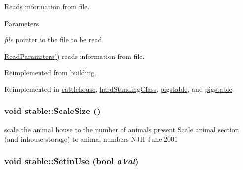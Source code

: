 Reads information from file. 
\begin{DoxyParams}{Parameters}
\item[{\em file}]pointer to the file to be read\end{DoxyParams}
\hyperlink{classstable_ab0195f308a48e008485cf5d04955a741}{ReadParameters()} reads information from file. 

Reimplemented from \hyperlink{classbuilding_a5649b5598b63c3a4cf7a4e6e7d452d5d}{building}.

Reimplemented in \hyperlink{classcattlehouse_a113f5bf0d97865c9872c0c4efd073861}{cattlehouse}, \hyperlink{classhard_standing_class_a87b03d8140b5d5913fc8e79cc8229410}{hardStandingClass}, \hyperlink{classpigstable_a97e3706555a93da782e5418df532078c}{pigstable}, and \hyperlink{classpigstable_aa31308b795d7a454e5156e8c2f49fe47}{pigstable}.\hypertarget{classstable_af4e0be5221f1bddebfe9297188e00089}{
\subsubsection[{ScaleSize}]{\setlength{\rightskip}{0pt plus 5cm}void stable::ScaleSize ()}}
\label{classstable_af4e0be5221f1bddebfe9297188e00089}


scale the \hyperlink{classanimal}{animal} house to the number of animals present Scale \hyperlink{classanimal}{animal} section (and inhouse \hyperlink{classstorage}{storage}) to \hyperlink{classanimal}{animal} numbers NJH June 2001 \hypertarget{classstable_a001595b56aa1e470ed4f54f3df9208ed}{
\subsubsection[{SetinUse}]{\setlength{\rightskip}{0pt plus 5cm}void stable::SetinUse (bool {\em aVal})}}
\label{classstable_a001595b56aa1e470ed4f54f3df9208ed}


